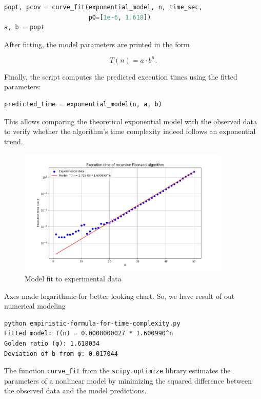 \documentclass{article}
\begin{document}
\begin{lstlisting}[language=Python]
popt, pcov = curve_fit(exponential_model, n, time_sec,
                       p0=[1e-6, 1.618])
a, b = popt
\end{lstlisting}

After fitting, the model parameters are printed in the form

\[
	T(n) = a \cdot b^n.
\]

Finally, the script computes the predicted execution times using the fitted parameters:

\begin{lstlisting}[language=Python]
predicted_time = exponential_model(n, a, b)
\end{lstlisting}

This allows comparing the theoretical exponential model with the observed data to verify whether the algorithm’s time complexity indeed follows an exponential trend.
\begin{figure}[H]
	\centering
	\includegraphics[width=0.9\textwidth]{./recursive-time-exec/experimental-data-formula.png}
	\caption{Model fit to experimental data}
	\label{fig:experimental_vs_theoretical}
\end{figure}

Axes made logarithmic for better looking chart.
So, we have result of out numerical modeling 
\begin{verbatim}
python empiristic-formula-for-time-complexity.py
Fitted model: T(n) = 0.0000000027 * 1.600990^n
Golden ratio (φ): 1.618034
Deviation of b from φ: 0.017044
\end{verbatim}

The function \texttt{curve\_fit} from the \texttt{scipy.optimize} library estimates the parameters of a nonlinear model by minimizing the squared difference between the observed data and the model predictions.
\end{document}
